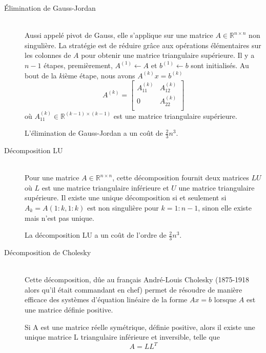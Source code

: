\begin{description}
  \item[\'Elimination de Gauss-Jordan] \hfill \\
Aussi appel\'e pivot de Gauss, elle s'applique sur une matrice $A \in \mathbb{R}^{n\times n}$ non singuli\`ere.
 La strat\'egie est de r\'eduire gr\^ace aux op\'erations \'el\'ementaires sur les colonnes de $A$ pour obtenir une matrice triangulaire sup\'erieure. 
Il y a $n-1$ \'etapes, premi\`erement, $A^{(1)}\leftarrow A$ et $b^{(1)}\leftarrow b$ sont initialis\'es. Au bout
de la $k$i\`eme \'etape, nous avons $A^{(k)}x=b^{(k)}$ %
$$A^{(k)}= \left[
\begin{array}{rl}
 A^{(k)}_{11} & A^{(k)}_{12} \\
 0       & A^{(k)}_{22} \\
\end{array}\right]$$
o\`u $A^{(k)}_{11} \in \mathbb{R}^{(k-1)\times(k-1)}$ est une matrice triangulaire sup\'erieure.

L'\'elimination de Gauss-Jordan a un coût de $\frac{2}{3}n^3$.


  \item[D\'ecomposition LU] \hfill \\
Pour une matrice $A\in \mathbb{R}^{n\times n}$, cette d\'ecomposition fournit deux matrices $LU$ o\`u
$L$ est une matrice triangulaire inf\'erieure et $U$ une matrice triangulaire sup\'erieure. Il existe une unique d\'ecomposition si
et seulement si $A_k=A(1:k,1:k)$ est non singuli\`ere pour $k=1:n-1$, sinon elle existe mais n'est pas unique.

La d\'ecomposition LU a un coût de l'ordre de $\frac{2}{3}n^3$.


  \item[D\'ecomposition de Cholesky] \hfill \\


Cette d\'ecomposition, dûe au fran\c{c}ais Andr\'e-Louis Cholesky (1875-1918 alors qu'il \'etait commandant en chef) permet de r\'esoudre de mani\`ere efficace des syst\`emes
 d'\'equation lin\'eaire de la forme $Ax=b$ lorsque $A$ est une matrice d\'efinie positive.

\begin{frtheoreme}
 Si A est une matrice r\'eelle sym\'etrique,  d\'efinie positive, alors il existe une unique matrice L
triangulaire inf\'erieure et inversible, telle que
 $$A = LL^T$$
\end{frtheoreme}




\end{description}
